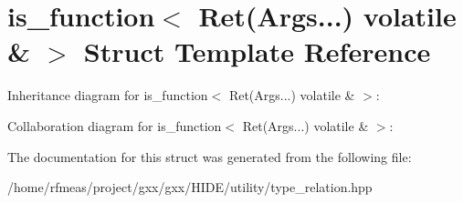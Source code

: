 \hypertarget{structis__function_3_01Ret_07Args_8_8_8_08_01volatile_01_6_01_4}{}\section{is\+\_\+function$<$ Ret(Args...) volatile \& $>$ Struct Template Reference}
\label{structis__function_3_01Ret_07Args_8_8_8_08_01volatile_01_6_01_4}


Inheritance diagram for is\+\_\+function$<$ Ret(Args...) volatile \& $>$\+:


Collaboration diagram for is\+\_\+function$<$ Ret(Args...) volatile \& $>$\+:


The documentation for this struct was generated from the following file\+:\begin{DoxyCompactItemize}
\item 
/home/rfmeas/project/gxx/gxx/\+H\+I\+D\+E/utility/type\+\_\+relation.\+hpp\end{DoxyCompactItemize}

